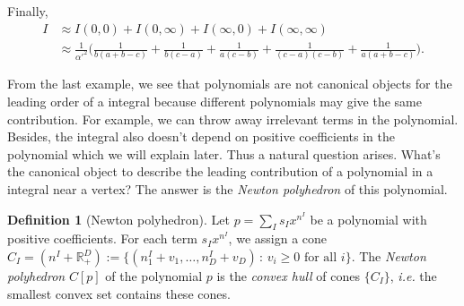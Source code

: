 \documentclass[12pt]{article}
\theoremstyle{definition}
\newtheorem{defi}[para]{Definition}
\theoremstyle{plain}
\begin{document}
Finally,
\begin{align*}
	I&\approx I(0,0)+I(0,\infty)+I(\infty,0)+I(\infty,\infty)\\
	 &\approx \frac{1}{{\alpha'}^2}
	 \biggl(
\frac{1}{b (a+b-c)}+\frac{1}{b (c-a)}+\frac{1}{a (c-b)}+\frac{1}{(c-a) (c-b)}+\frac{1}{a (a+b-c)}
	 \biggr).
\end{align*}

From the last example, we see that polynomials are not canonical objects 
for the leading order of a integral because different polynomials may give the 
same contribution. For example, we can throw away irrelevant terms in the 
polynomial. Besides, the integral also doesn't depend on positive coefficients
in the polynomial which we will explain later.
Thus a natural question arises. What's the canonical object to describe the 
leading contribution of a polynomial in a integral near a vertex? The answer is 
the \textit{Newton polyhedron} of this polynomial.

\begin{defi}[Newton polyhedron]
Let $p=\sum_{I}s_I x^{n^I}$ be a polynomial with positive coefficients.
For each term $s_I x^{n^I}$, we assign a cone 
$C_{I}=(n^I+\mathbb R^D_{+}):=\{(n^I_1+v_1,\dots,n^I_D+v_D)\,:\, 
\text{$v_i\geq 0$ for all $i$}\}$. The 
\textit{Newton polyhedron} $C[p]$ of the polynomial $p$ 
is the \textit{convex hull} of cones $\{C_I\}$, 
\textit{i.e.} the smallest convex set contains these cones.
\end{defi}



\end{document}
